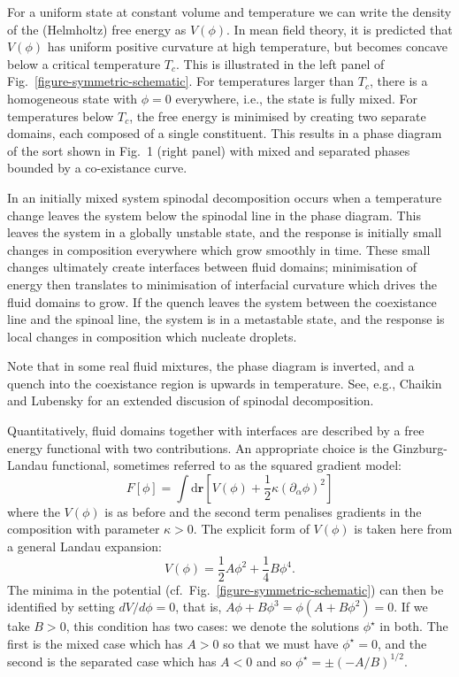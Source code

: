 For a uniform
state at constant volume and temperature we can write the density of the
(Helmholtz) free energy as $V(\phi)$. In mean field theory, it is predicted
that $V(\phi)$ has uniform positive curvature at high temperature, but
becomes concave below a critical temperature $T_c$. This is illustrated
in the left panel of Fig.~\ref{figure-symmetric-schematic}.
For temperatures larger than $T_c$, there is a homogeneous state with
$\phi = 0$ everywhere, i.e., the state is fully mixed. For temperatures
below $T_c$, the free energy is minimised by creating two separate
domains, each composed of a single constituent. This results in a
phase diagram of the sort 
shown in Fig.~1 (right panel) with mixed and
separated phases bounded by a co-existance curve.

In an initially mixed system spinodal decomposition occurs when a
temperature change leaves the system below the spinodal line in the
phase diagram. This leaves the system in a globally unstable state,
and the response is initially small changes in composition
everywhere which grow smoothly in time. These small changes
ultimately create interfaces between fluid domains;
minimisation of energy then translates to minimisation of interfacial
curvature which drives the fluid domains to grow. If the quench leaves
the system between the coexistance line and the spinoal line, the
system is in a metastable state, and the response is local changes
in composition which nucleate droplets.

Note that in some real fluid mixtures, the phase diagram is inverted,
and a quench into the coexistance region is upwards in temperature.
See, e.g., Chaikin and Lubensky \cite{chaikin-lubensky} for an extended
discusion of spinodal decomposition.

Quantitatively, fluid domains together with interfaces are described
by a free energy functional with two contributions. An appropriate
choice is the Ginzburg-Landau functional, sometimes referred to as the
squared gradient model:
\begin{equation}
F[\phi]  = \int \mathrm{d}\mathbf{r} [ V(\phi) + {\textstyle\frac{1}{2}}
\kappa (\partial_\alpha \phi)^2 ] 
\end{equation}
where the $V(\phi)$ is as before and the second term penalises gradients
in the composition with parameter $\kappa > 0$. The explicit form of
$V(\phi)$ is taken here from a general Landau expansion:
\begin{equation}
V(\phi) = {\textstyle\frac{1}{2}} A \phi^2
        + {\textstyle\frac{1}{4}} B \phi^4.
\end{equation}
The minima in the
potential (cf.\ Fig.~\ref{figure-symmetric-schematic}) can then be
identified by setting
$dV / d \phi = 0$, that is, $A\phi + B\phi^3 = \phi (A + B\phi^2) = 0$.
If we take $B>0$, this condition has two cases: we denote the
solutions $\phi^\star$ in both. The first is the mixed case
which has $A > 0$ so that we
must have $\phi^\star = 0$, and the second is the separated case
which has $A < 0$ and so 
$\phi^\star = \pm (-A/B)^{1/2}$.


